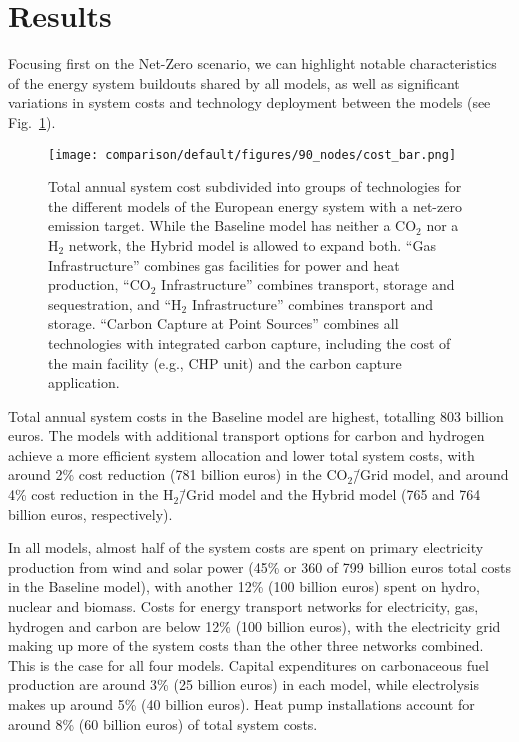 \documentclass[twocolumn]{article}
\newcommand{\COtwo}{CO$_2$}
\newcommand{\Htwo}{H$_2$}
\newcommand{\modBase}{Baseline model}
\newcommand{\modCO}{CO$_2$\=/Grid model}
\newcommand{\modH}{H$_2$\=/Grid model}
\newcommand{\modHybrid}{Hybrid model}
\begin{document}
\section{Results}
\label{sec:results}


Focusing first on the Net-Zero scenario, we can highlight notable characteristics of the energy system buildouts shared by all models, as well as significant variations in system costs and technology deployment between the models (see Fig.~\ref{fig:cost_bar}).

\begin{figure}[ht!]
    \centering
    \texttt{[image: comparison/default/figures/90\_nodes/cost\_bar.png]}
    \caption[short]{Total annual system cost subdivided into groups of technologies for the different models of the European energy system with a net-zero emission target. While the \modBase{} has neither a \COtwo{} nor a \Htwo{} network, the \modHybrid{} is allowed to expand both. ``Gas Infrastructure'' combines gas facilities for power and heat production, ``\COtwo{} Infrastructure'' combines transport, storage and sequestration, and ``\Htwo{} Infrastructure'' combines transport and storage. ``Carbon Capture at Point Sources'' combines all technologies with integrated carbon capture, including the cost of the main facility (e.g., CHP unit) and the carbon capture application.}
    \label{fig:cost_bar}
\end{figure}

Total annual system costs in the \modBase{} are highest, totalling \label{}803 billion euros. The models with additional transport options for carbon and hydrogen achieve a more efficient system allocation and lower total system costs, with around \label{}2\% cost reduction (\label{}781 billion euros) in the \modCO{}, and around \label{}4\% cost reduction in the \modH{} and the \modHybrid{} (\label{}765 and \label{}764 billion euros, respectively).

In all models, almost half of the system costs are spent on primary electricity production from wind and solar power (\label{}45\% or \label{}360 of \label{}799 billion euros total costs in the \modBase{}), with another \label{}12\% (\label{}100 billion euros) spent on hydro, nuclear and biomass. Costs for energy transport networks for electricity, gas, hydrogen and carbon are below \label{}12\% (\label{}100 billion euros), with the electricity grid making up more of the system costs than the other three networks combined. This is the case for all four models. Capital expenditures on carbonaceous fuel production are around \label{}3\% (\label{}25 billion euros) in each model, while electrolysis makes up around \label{}5\% (\label{}40 billion euros). Heat pump installations account for around \label{}8\% (60 billion euros) of total system costs.
\end{document}
